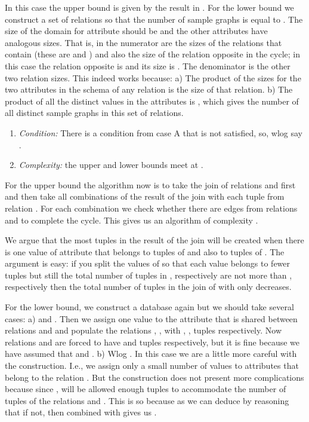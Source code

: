 In this case the upper bound is given by the result in \cite{NgoPRR12}.
For the lower bound we construct a set of relations so that the number of sample graphs is equal to .
The size of the domain for attribute  should be 
and the other attributes have analogous sizes. That is, in the
numerator are the sizes of the relations that contain  (these are   and )
and also the size of the relation opposite  in the cycle; in this
case the relation opposite is  and its size is . The
denominator is the other two relation sizes. This indeed works because: a) The product
of the sizes for the two attributes in the schema of any relation is
the size of that relation.  b) The product of all the distinct values in the attributes is
, which gives the number of all distinct sample graphs in this set of relations.


\begin{enumerate}
 \item {\sl Condition:} There is a condition from case A that is not satisfied, so, wlog say .

\item {\sl Complexity:}  the upper and lower bounds meet at  .
\end{enumerate}

For the upper bound the algorithm now is to take the join of relations
 and  first and then take all combinations of the result
of the join with each tuple from relation . For each combination we check
whether there are edges from relations  and  to complete the cycle.
This gives us an algorithm of complexity .

We argue that
the most tuples in the result of the join will be created when
there is one value of attribute  that belongs to  tuples
of  and also to  tuples of .
The argument is easy: if you split the values of
 so that each value belongs to fewer tuples but still the total number of tuples in
,  respectively are not more than ,  respectively then the total number
of tuples in the join of  with  only decreases.


For the lower bound, we construct a database
again but we should take several cases:
a)  and . Then we assign one value to the
attribute that is shared between relations  and  and
populate the relations , ,  with , ,  tuples respectively.
Now relations  and  are forced to have   and  tuples
respectively, but it is fine because we have assumed that   and .
b) Wlog  . In this case we are a little more careful with the
construction. I.e., we assign only a small number of values to
attributes that belong to the relation .  But the construction
does not present more complications because since ,
 will be allowed enough tuples to accommodate the number of tuples
of the relations  and . This is so because  as we can deduce by
reasoning that if not, then  combined with  gives us .

